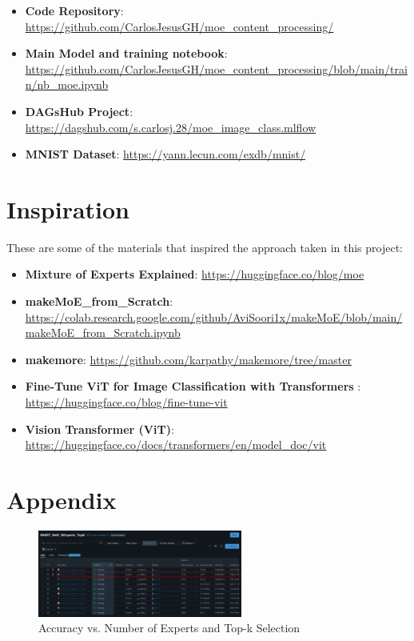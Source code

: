 \documentclass[a4paper,11pt]{article}
\begin{document}
\begin{itemize}
    \item \textbf{Code Repository}: \url{https://github.com/CarlosJesusGH/moe_content_processing/}
    \item \textbf{Main Model and training notebook}: \url{https://github.com/CarlosJesusGH/moe_content_processing/blob/main/train/nb_moe.ipynb}
    \item \textbf{DAGsHub Project}: \url{https://dagshub.com/s.carlosj.28/moe_image_class.mlflow}
    \item \textbf{MNIST Dataset}: \url{https://yann.lecun.com/exdb/mnist/}
\end{itemize}


\section{Inspiration}

These are some of the materials that inspired the approach taken in this project:

\begin{itemize}

    \item \textbf{Mixture of Experts Explained}: \url{https://huggingface.co/blog/moe}
    \item \textbf{makeMoE\_from\_Scratch}: \url{https://colab.research.google.com/github/AviSoori1x/makeMoE/blob/main/makeMoE_from_Scratch.ipynb}
    \item \textbf{makemore}: 
    \url{https://github.com/karpathy/makemore/tree/master}
    \item \textbf{Fine-Tune ViT for Image Classification with Transformers }: \\ \url{https://huggingface.co/blog/fine-tune-vit}
    \item \textbf{Vision Transformer (ViT)}: \\ \url{https://huggingface.co/docs/transformers/en/model_doc/vit}
    
\end{itemize}


\section{Appendix}

\begin{figure}[H]
    \centering
    \includegraphics[width=0.6\textwidth]{images/experts_topk.png}
    \caption{Accuracy vs. Number of Experts and Top-k Selection}
    \label{fig:experts_topk}
\end{figure}
\end{document}
